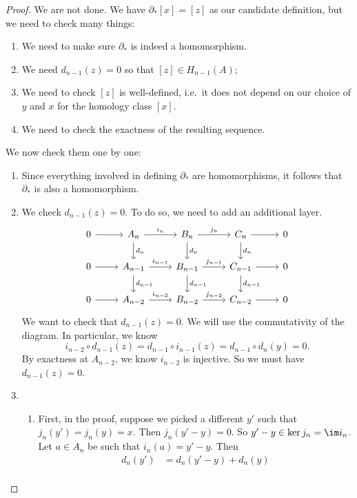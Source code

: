 \documentclass[a4paper]{article}
\begin{document}
\begin{proof}
  We are not done. We have $\partial_* [x] = [z]$ as our candidate definition, but we need to check many things:
  \begin{enumerate}
    \item We need to make sure $\partial_*$ is indeed a homomorphism.
    \item We need $d_{n - 1}(z) = 0$ so that $[z] \in H_{n - 1}(A)$;
    \item We need to check $[z]$ is well-defined, i.e.\ it does not depend on our choice of $y$ and $x$ for the homology class $[x]$.
    \item We need to check the exactness of the resulting sequence.
  \end{enumerate}
  We now check them one by one:
  \begin{enumerate}
    \item Since everything involved in defining $\partial_*$ are homomorphisms, it follows that $\partial_*$ is also a homomorphism.
    \item We check $d_{n - 1}(z) = 0$. To do so, we need to add an additional layer.
      \[
        \begin{tikzcd}
          0 \ar[r] & A_n \ar[r, "i_n"] \ar[d, "d_n"] & B_n \ar[r, "j_n"] \ar[d, "d_n"] & C_n \ar[r] \ar[d, "d_n"] & 0\\
          0 \ar[r] & A_{n - 1} \ar[r, "i_{n - 1}"] \ar[d, "d_{n - 1}"] & B_{n - 1} \ar[r, "j_{n - 1}"] \ar[d, "d_{n - 1}"] & C_{n - 1} \ar[r] \ar[d, "d_{n - 1}"] & 0\\
          0 \ar[r] & A_{n - 2} \ar[r, "i_{n - 2}"] & B_{n - 2} \ar[r, "j_{n - 2}"] & C_{n - 2} \ar[r] & 0
        \end{tikzcd}
      \]
      We want to check that $d_{n - 1}(z) = 0$. We will use the commutativity of the diagram. In particular, we know
      \[
        i_{n - 2} \circ d_{n - 1}(z) = d_{n - 1} \circ i_{n - 1} (z) = d_{n - 1} \circ d_n(y) = 0.
      \]
      By exactness at $A_{n - 2}$, we know $i_{n - 2}$ is injective. So we must have $d_{n - 1}(z) = 0$.
    \item
      \begin{enumerate}
        \item First, in the proof, suppose we picked a different $y'$ such that $j_n(y') = j_n(y) = x$. Then $j_n(y' - y) = 0$. So $y' - y \in \ker j_n = \im i_n$. Let $a \in A_n$ be such that $i_n(a) = y' - y$. Then
          \begin{align*}
            d_n(y') &= d_n(y' - y) + d_n(y) \\

\end{align*}
\end{enumerate}
\end{enumerate}
\end{proof}
\end{document}
